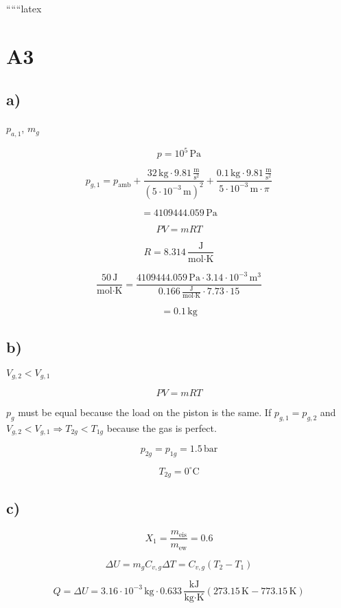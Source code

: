 
``````latex


\section*{A3}

\subsection*{a)}
$p_{a,1}$, $m_g$

\[
p = 10^5 \, \text{Pa}
\]

\[
p_{g,1} = p_{\text{amb}} + \frac{32 \, \text{kg} \cdot 9.81 \, \frac{\text{m}}{\text{s}^2}}{\left(5 \cdot 10^{-3} \, \text{m}\right)^2} + \frac{0.1 \, \text{kg} \cdot 9.81 \, \frac{\text{m}}{\text{s}^2}}{5 \cdot 10^{-3} \, \text{m} \cdot \pi}
\]

\[
= 4109444.059 \, \text{Pa}
\]

\[
PV = mRT
\]

\[
R = 8.314 \, \frac{\text{J}}{\text{mol} \cdot \text{K}}
\]

\[
\frac{50 \, \text{J}}{\text{mol} \cdot \text{K}} = \frac{4109444.059 \, \text{Pa} \cdot 3.14 \cdot 10^{-3} \, \text{m}^3}{0.166 \, \frac{\text{J}}{\text{mol} \cdot \text{K}} \cdot 7.73 \cdot 15}
\]

\[
= 0.1 \, \text{kg}
\]

\subsection*{b)}
$V_{g,2} < V_{g,1}$

\[
PV = mRT
\]

$p_{g}$ must be equal because the load on the piston is the same. If $p_{g,1} = p_{g,2}$ and $V_{g,2} < V_{g,1} \Rightarrow T_{2g} < T_{1g}$ because the gas is perfect.

\[
p_{2g} = p_{1g} = 1.5 \, \text{bar}
\]

\[
T_{2g} = 0^\circ \text{C}
\]

\subsection*{c)}
\[
X_1 = \frac{m_{\text{eis}}}{m_{\text{ew}}} = 0.6
\]

\[
\Delta U = m_{g} C_{v,g} \Delta T = C_{v,g} (T_2 - T_1)
\]

\[
Q = \Delta U = 3.16 \cdot 10^{-3} \, \text{kg} \cdot 0.633 \, \frac{\text{kJ}}{\text{kg} \cdot \text{K}} \left( 273.15 \, \text{K} - 773.15 \, \text{K} \right)
\]

